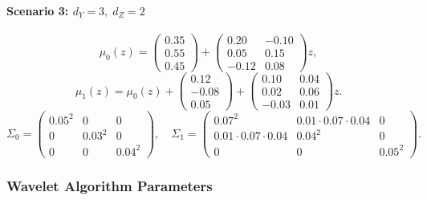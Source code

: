 \documentclass{article}
\theoremstyle{plain}
\theoremstyle{definition}
\theoremstyle{plain}
\begin{document}
\paragraph{Scenario 3: $d_Y=3,\; d_Z=2$}
\[
\mu_0(z)=
\begin{pmatrix}0.35\\0.55\\0.45\end{pmatrix}
+
\begin{pmatrix}
0.20 & -0.10\\
0.05 & 0.15\\
-0.12 & 0.08
\end{pmatrix}z,
\]
\[
\mu_1(z)=\mu_0(z)+
\begin{pmatrix}0.12\\-0.08\\0.05\end{pmatrix}
+
\begin{pmatrix}
0.10 & 0.04\\
0.02 & 0.06\\
-0.03 & 0.01
\end{pmatrix}z.
\]
\[
\Sigma_0=
\begin{pmatrix}
0.05^2 & 0 & 0\\
0 & 0.03^2 & 0\\
0 & 0 & 0.04^2
\end{pmatrix},\quad
\Sigma_1=
\begin{pmatrix}
0.07^2 & 0.01\cdot0.07\cdot0.04 & 0\\
0.01\cdot0.07\cdot0.04 & 0.04^2 & 0\\
0 & 0 & 0.05^2
\end{pmatrix}.
\]

\subsubsection{Wavelet Algorithm Parameters}
\end{document}
